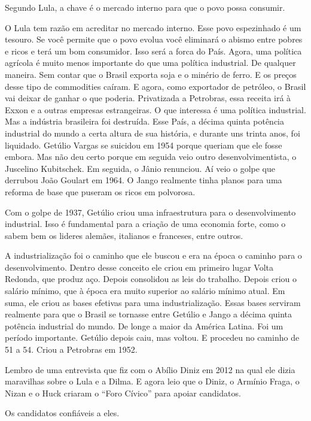 \falaG Segundo Lula, a chave é o mercado interno para que o povo possa
consumir.

\falaM O Lula tem razão em acreditar no mercado interno. Esse povo
espezinhado é um tesouro. Se você permite que o povo evolua você
eliminará o abismo entre pobres e ricos e terá um bom consumidor. Isso
será a forca do País. Agora, uma política agrícola é muito menos
importante do que uma política industrial. De qualquer maneira. Sem
contar que o Brasil exporta soja e o minério de ferro. E os preços desse
tipo de commodities caíram. E agora, como exportador de petróleo, o
Brasil vai deixar de ganhar o que poderia. Privatizada a Petrobras, essa
receita irá à Exxon e a outras empresas estrangeiras. O que interessa é
uma política industrial. Mas a indústria brasileira foi destruída. Esse
País, a décima quinta potência industrial do mundo a certa altura de sua
história, e durante uns trinta anos, foi liquidado. Getúlio Vargas se
suicidou em 1954 porque queriam que ele fosse embora. Mas não deu certo
porque em seguida veio outro desenvolvimentista, o Juscelino Kubitschek.
Em seguida, o Jânio renunciou. Aí veio o golpe que derrubou João Goulart
em 1964. O Jango realmente tinha planos para uma reforma de base que
puseram os ricos em polvorosa.

\falaG Com o golpe de 1937, Getúlio criou uma infraestrutura para o
desenvolvimento industrial. Isso é fundamental para a criação de uma
economia forte, como o sabem bem os lideres alemães, italianos e
franceses, entre outros.

\falaM A industrialização foi o caminho que ele buscou e era na época o
caminho para o desenvolvimento. Dentro desse conceito ele criou em
primeiro lugar Volta Redonda, que produz aço. Depois consolidou as leis
do trabalho. Depois criou o salário mínimo, que à época era muito
superior ao salário mínimo atual. Em suma, ele criou as bases efetivas
para uma industrialização. Essas bases serviram realmente para que o
Brasil se tornasse entre Getúlio e Jango a décima quinta potência
industrial do mundo. De longe a maior da América Latina. Foi um período
importante. Getúlio depois caiu, mas voltou. E procedeu no caminho de 51
a 54. Criou a Petrobras em 1952.

\falaG Lembro de uma entrevista que fiz com o Abílio Diniz em 2012 na qual
ele dizia maravilhas sobre o Lula e a Dilma. E agora leio que o Diniz, o
Armínio Fraga, o Nizan e o Huck criaram o ``Foro Cívico'' para apoiar
candidatos.

\falaM Os candidatos confiáveis a eles.

